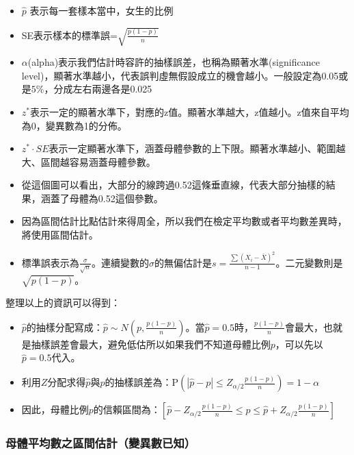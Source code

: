 \documentclass[hyperref,]{ctexart}
\providecommand{\tightlist}{%
  \setlength{\itemsep}{0pt}\setlength{\parskip}{0pt}}
\begin{document}
\begin{itemize}
\tightlist
\item
  \(\hat{p}\) 表示每一套樣本當中，女生的比例
\item
  SE表示樣本的標準誤=\(\sqrt{\frac{p(1-p)}{n}}\)
\item
  \(\alpha\)(alpha)表示我們估計時容許的抽樣誤差，也稱為顯著水準(significance
  level)，顯著水準越小，代表誤判虛無假設成立的機會越小。一般設定為0.05或是\(5\%\)，分成左右兩邊各是0.025
\item
  \(z^{*}\)表示一定的顯著水準下，對應的z值。顯著水準越大，z值越小。z值來自平均為0，變異數為1的分佈。
\item
  \(z^{*}\cdot SE\)表示一定顯著水準下，涵蓋母體參數的上下限。顯著水準越小、範圍越大、區間越容易涵蓋母體參數。
\item
  從這個圖可以看出，大部分的線跨過0.52這條垂直線，代表大部分抽樣的結果，涵蓋了母體為0.52這個參數。
\item
  因為區間估計比點估計來得周全，所以我們在檢定平均數或者平均數差異時，將使用區間估計。
\item
  標準誤表示為\(\frac{\sigma}{\sqrt{n}}\)。連續變數的\(\sigma\)的無偏估計是\(s=\frac{\sum(X_{i}-\bar{X})^2}{n-1}\)。二元變數則是\(\sqrt{p(1-p)}\)。
\end{itemize}

整理以上的資訊可以得到：

\begin{itemize}
\tightlist
\item
  \(\hat{p}\)的抽樣分配寫成：\(\hat{p}\sim N(p, \frac{p(1-p)}{n})\)。當\(\hat{p}=0.5\)時，\(\frac{p(1-p)}{n}\)會最大，也就是抽樣誤差會最大，避免低估所以如果我們不知道母體比例\(p\)，可以先以\(\hat{p}=0.5\)代入。
\item
  利用\(Z\)分配求得\(\hat{p}\)與\(p\)的抽樣誤差為：\(\text{P}(|\hat{p}-p|\leq Z_{\alpha/2}\frac{p(1-p)}{n}) =1-\alpha\)
\item
  因此，母體比例\(p\)的信賴區間為：\([\hat{p}-Z_{\alpha/2}\frac{p(1-p)}{n}\leq p\leq \hat{p}+Z_{\alpha/2}\frac{p(1-p)}{n}]\)
\end{itemize}

\hypertarget{ux6bcdux9ad4ux5e73ux5747ux6578ux4e4bux5340ux9593ux4f30ux8a08ux8b8aux7570ux6578ux5df2ux77e5}{%
\subsubsection{母體平均數之區間估計（變異數已知）}\label{ux6bcdux9ad4ux5e73ux5747ux6578ux4e4bux5340ux9593ux4f30ux8a08ux8b8aux7570ux6578ux5df2ux77e5}}
\end{document}
